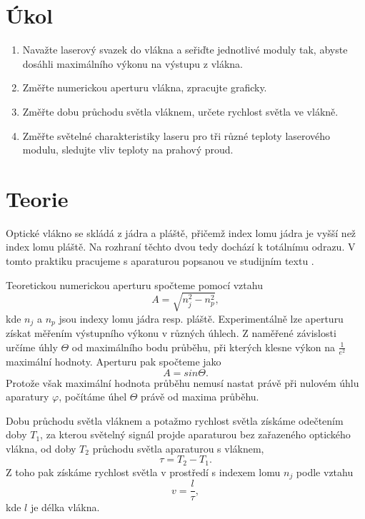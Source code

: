 \documentclass{protokol}
\begin{document}
  \section*{Úkol}

    \begin{enumerate}
      \item Navažte laserový svazek do vlákna a seřiďte jednotlivé moduly tak, abyste dosáhli maximálního výkonu na výstupu z vlákna.
      \item Změřte numerickou aperturu vlákna, zpracujte graficky.
      \item Změřte dobu průchodu světla vláknem, určete rychlost světla ve vlákně.
      \item Změřte světelné charakteristiky laseru pro tři různé teploty laserového modulu, sledujte vliv teploty na prahový proud.
    \end{enumerate}

  \section*{Teorie}

    Optické vlákno se skládá z jádra a pláště, přičemž index lomu jádra je vyšší než index lomu pláště. Na rozhraní těchto dvou tedy dochází k totálnímu odrazu.
    V tomto praktiku pracujeme s aparaturou popsanou ve studijním textu \cite{pokyny}.

    Teoretickou numerickou aperturu spočteme pomocí vztahu 
    \begin{equation}
      A = \sqrt{n_j^2 - n_p^2},
    \end{equation}
    kde $n_j$ a $n_p$ jsou indexy lomu jádra resp. pláště.
    Experimentálně lze aperturu získat měřením výstupního výkonu v různých úhlech. Z naměřené závislosti určíme úhly $\Theta$ od maximálního bodu průběhu, při kterých klesne výkon na $\frac{1}{e^2}$ maximální hodnoty. Aperturu pak spočteme jako 
    \begin{equation}
      A = sin \Theta.
    \end{equation}
    Protože však maximální hodnota průběhu nemusí nastat právě při nulovém úhlu aparatury $\varphi$, počítáme úhel $\Theta$ právě od maxima průběhu.

    Dobu průchodu světla vláknem a potažmo rychlost světla získáme odečtením doby $T_1$, za kterou světelný signál projde aparaturou bez zařazeného optického vlákna, od doby $T_2$ průchodu světla aparaturou s vláknem,
    \begin{equation}
      \tau = T_2 - T_1.
    \end{equation}
    Z toho pak získáme rychlost světla v prostředí s indexem lomu $n_j$ podle vztahu 
    \begin{equation}
      v = \frac{l}{\tau},
    \end{equation}
    kde $l$ je délka vlákna.
\end{document}
